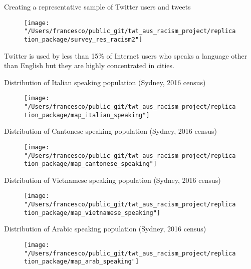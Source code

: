 \documentclass[serif, aspectratio=169]{beamer}
\begin{document}
\begin{frame}
{Creating a representative sample of Twitter users and tweets}

\begin{figure}
\texttt{[image: "/Users/francesco/public\_git/twt\_aus\_racism\_project/replication\_package/survey\_res\_racism2"]}
\end{figure}

Twitter is used by less than 15\% of Internet users who speaks a language other than English but they are highly concentrated in cities. 


\end{frame}

\begin{frame}
{Distribution of Italian speaking population (Sydney, 2016 census)}

\begin{figure}
\texttt{[image: "/Users/francesco/public\_git/twt\_aus\_racism\_project/replication\_package/map\_italian\_speaking"]}
\end{figure}

\end{frame}

\begin{frame}
{Distribution of Cantonese speaking population (Sydney, 2016 census)}

\begin{figure}
\texttt{[image: "/Users/francesco/public\_git/twt\_aus\_racism\_project/replication\_package/map\_cantonese\_speaking"]}
\end{figure}

\end{frame}

\begin{frame}
{Distribution of Vietnamese speaking population (Sydney, 2016 census)}

\begin{figure}
\texttt{[image: "/Users/francesco/public\_git/twt\_aus\_racism\_project/replication\_package/map\_vietnamese\_speaking"]}
\end{figure}

\end{frame}

\begin{frame}
{Distribution of Arabic speaking population (Sydney, 2016 census)}

\begin{figure}
\texttt{[image: "/Users/francesco/public\_git/twt\_aus\_racism\_project/replication\_package/map\_arab\_speaking"]}
\end{figure}

\end{frame}
\end{document}
